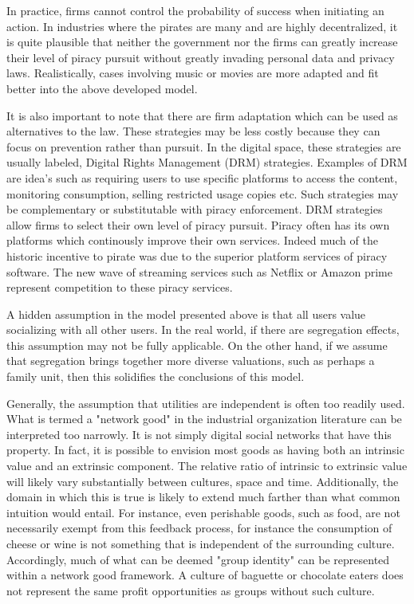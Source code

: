 \documentclass[12pt]{report}
\numberwithin{equation}{section}
\begin{document}
In practice, firms cannot control the probability of success when initiating an action. In industries where the pirates are many and are highly decentralized, it is quite plausible that neither the government nor the firms can greatly increase their level of piracy pursuit without greatly invading personal data and privacy laws. Realistically, cases involving music or movies are more adapted and fit better into the above developed model. 

It is also important to note that there are firm adaptation which can be used as alternatives to the law. These strategies may be less costly because they can focus on prevention rather than pursuit. In the digital space, these strategies are usually labeled, Digital Rights Management (DRM) strategies. Examples of DRM are idea's such as requiring users to use specific platforms to access the content, monitoring consumption, selling restricted usage copies etc. Such strategies may be complementary or substitutable with piracy enforcement. DRM strategies allow firms to select their own level of piracy pursuit. Piracy often has its own platforms which continously improve their own services. Indeed much of the historic incentive to pirate was due to the superior platform services of piracy software. The new wave of streaming services such as Netflix or Amazon prime represent competition to these piracy services.


A hidden assumption in the model presented above is that all users value socializing with all other users. In the real world, if there are segregation effects, this assumption may not be fully applicable. On the other hand, if we assume that segregation brings together more diverse valuations, such as perhaps a family unit, then this solidifies the conclusions of this model.

Generally, the assumption that utilities are independent is often too readily used. What is termed a "network good" in the industrial organization literature can be interpreted too narrowly. It is not simply digital social networks that have this property. In fact, it is possible to envision most goods as having both an intrinsic value and an extrinsic component. The relative ratio of intrinsic to extrinsic value will likely vary substantially between cultures, space and time. Additionally, the domain in which this is true is likely to extend much farther than what common intuition would entail. For instance, even perishable goods, such as food, are not necessarily exempt from this feedback process, for instance the consumption of cheese or wine is not something that is independent of the surrounding culture. Accordingly, much of what can be deemed "group identity" can be represented within a network good framework. A culture of baguette or chocolate eaters does not represent the same profit opportunities as groups without such culture.
\end{document}
